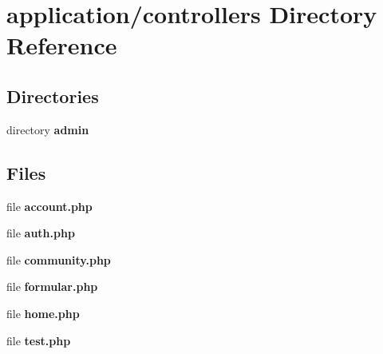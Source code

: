 \section{application/controllers Directory Reference}
\label{dir_43b5954026bbfd25898ac90541bc48cf}
\subsection*{Directories}
\begin{DoxyCompactItemize}
\item 
directory {\bf admin}
\end{DoxyCompactItemize}
\subsection*{Files}
\begin{DoxyCompactItemize}
\item 
file {\bf account.\-php}
\item 
file {\bf auth.\-php}
\item 
file {\bf community.\-php}
\item 
file {\bf formular.\-php}
\item 
file {\bf home.\-php}
\item 
file {\bf test.\-php}
\end{DoxyCompactItemize}
